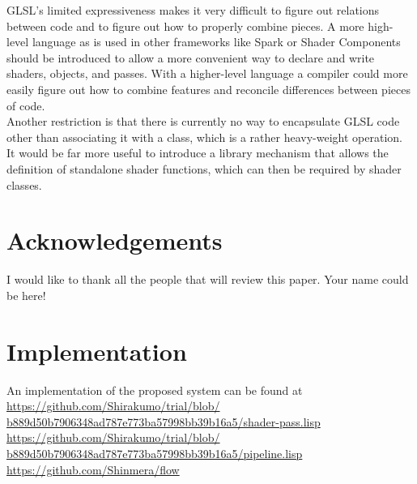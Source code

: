 \documentclass[format=sigconf]{acmart}
\begin{document}
GLSL's limited expressiveness makes it very difficult to figure out relations between code and to figure out how to properly combine pieces. A more high-level language as is used in other frameworks like Spark\cite{spark} or Shader Components\cite{components} should be introduced to allow a more convenient way to declare and write shaders, objects, and passes. With a higher-level language a compiler could more easily figure out how to combine features and reconcile differences between pieces of code. \\

Another restriction is that there is currently no way to encapsulate GLSL code other than associating it with a class, which is a rather heavy-weight operation. It would be far more useful to introduce a library mechanism that allows the definition of standalone shader functions, which can then be required by shader classes.

\section{Acknowledgements}\label{acknowledgements}
I would like to thank all the people that will review this paper. Your name could be here!

\section{Implementation}\label{implementation}
An implementation of the proposed system can be found at
\\\href{https://github.com/Shirakumo/trial/blob/b889d50b7906348ad787e773ba57998bb39b16a5/shader-pass.lisp}{https://github.com/Shirakumo/trial/blob/\\b889d50b7906348ad787e773ba57998bb39b16a5/shader-pass.lisp}
\\\href{https://github.com/Shirakumo/trial/blob/b889d50b7906348ad787e773ba57998bb39b16a5/pipeline.lisp}{https://github.com/Shirakumo/trial/blob/\\b889d50b7906348ad787e773ba57998bb39b16a5/pipeline.lisp}
\\\url{https://github.com/Shinmera/flow} \\


\end{document}
